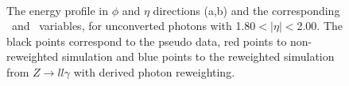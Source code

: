 \begin{figure}[htbp]
    \centering
	 \\
    \caption{The energy profile in $\phi$ and $\eta$ directions (a,b) and the corresponding \Rphi \ and \Reta \ variables, for unconverted photons with 1.80$<|\eta|<$2.00. The black points correspond to the pseudo data, red points to non-reweighted simulation and blue points to the reweighted simulation from $Z\rightarrow ll\gamma$ with derived photon reweighting.}
    \label{Photon:2}
\end{figure}

